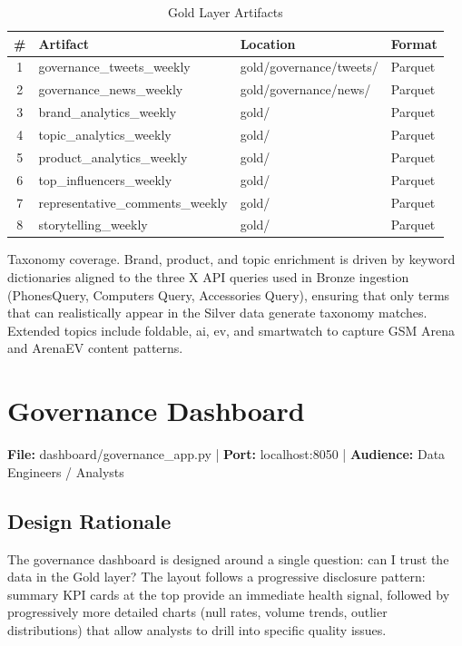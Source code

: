 \documentclass[12pt, a4paper]{article}
\begin{document}
\begin{table}[h]
\centering
\renewcommand{\arraystretch}{1.2}
\begin{tabularx}{\textwidth}{c l X l}
\toprule
\textbf{\#} & \textbf{Artifact} & \textbf{Location} & \textbf{Format} \\
\midrule
1 & governance\_tweets\_weekly & gold/governance/tweets/ & Parquet \\
2 & governance\_news\_weekly & gold/governance/news/ & Parquet \\
3 & brand\_analytics\_weekly & gold/ & Parquet \\
4 & topic\_analytics\_weekly & gold/ & Parquet \\
5 & product\_analytics\_weekly & gold/ & Parquet \\
6 & top\_influencers\_weekly & gold/ & Parquet \\
7 & representative\_comments\_weekly & gold/ & Parquet \\
8 & storytelling\_weekly & gold/ & Parquet \\
\bottomrule
\end{tabularx}
\caption{Gold Layer Artifacts}
\end{table}

Taxonomy coverage. Brand, product, and topic enrichment is driven by keyword dictionaries aligned to the three X API queries used in Bronze ingestion (PhonesQuery, Computers Query, Accessories Query), ensuring that only terms that can realistically appear in the Silver data generate taxonomy matches. Extended topics include foldable, ai, ev, and smartwatch to capture GSM Arena and ArenaEV content patterns.

\section{Governance Dashboard}
\textbf{File:} dashboard/governance\_app.py | \textbf{Port:} localhost:8050 | \textbf{Audience:} Data Engineers / Analysts

\subsection{Design Rationale}
The governance dashboard is designed around a single question: can I trust the data in the Gold layer? The layout follows a progressive disclosure pattern: summary KPI cards at the top provide an immediate health signal, followed by progressively more detailed charts (null rates, volume trends, outlier distributions) that allow analysts to drill into specific quality issues. 
\end{document}
